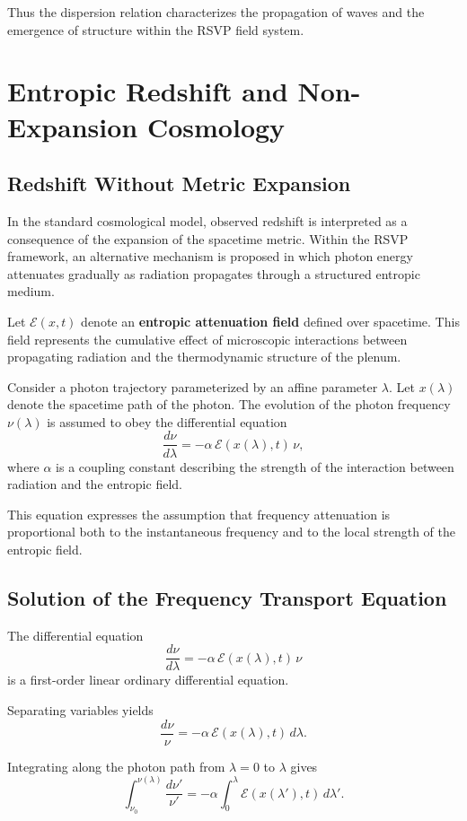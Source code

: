 \documentclass[11pt, openany]{book}
\theoremstyle{plain}
\theoremstyle{definition}
\theoremstyle{remark}
\begin{document}
Thus the dispersion relation characterizes the propagation of waves and
the emergence of structure within the RSVP field system.

\chapter{Entropic Redshift and Non-Expansion Cosmology}

\section{Redshift Without Metric Expansion}

In the standard cosmological model, observed redshift is interpreted as
a consequence of the expansion of the spacetime metric.  Within the RSVP
framework, an alternative mechanism is proposed in which photon energy
attenuates gradually as radiation propagates through a structured
entropic medium.

Let $\mathcal{E}(x,t)$ denote an \textbf{entropic attenuation field}
defined over spacetime.  This field represents the cumulative effect of
microscopic interactions between propagating radiation and the
thermodynamic structure of the plenum.

Consider a photon trajectory parameterized by an affine parameter
$\lambda$.  Let $x(\lambda)$ denote the spacetime path of the photon.
The evolution of the photon frequency $\nu(\lambda)$ is assumed to obey
the differential equation
\[
\frac{d\nu}{d\lambda}
=
-\alpha\,\mathcal{E}(x(\lambda),t)\,\nu,
\]
where $\alpha$ is a coupling constant describing the strength of the
interaction between radiation and the entropic field.

This equation expresses the assumption that frequency attenuation is
proportional both to the instantaneous frequency and to the local
strength of the entropic field.

\section{Solution of the Frequency Transport Equation}

The differential equation
\[
\frac{d\nu}{d\lambda}=-\alpha\,\mathcal{E}(x(\lambda),t)\,\nu
\]
is a first-order linear ordinary differential equation.

Separating variables yields
\[
\frac{d\nu}{\nu}
=
-\alpha\,\mathcal{E}(x(\lambda),t)\,d\lambda.
\]

Integrating along the photon path from $\lambda=0$ to $\lambda$ gives
\[
\int_{\nu_0}^{\nu(\lambda)}\frac{d\nu'}{\nu'}
=
-\alpha\int_0^\lambda
\mathcal{E}(x(\lambda'),t)\,d\lambda'.
\]
\end{document}
